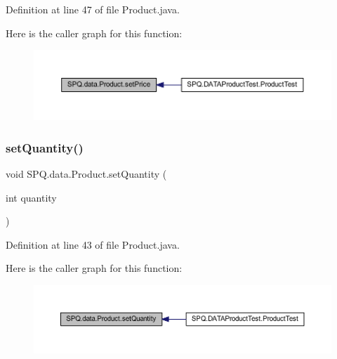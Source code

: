 Definition at line 47 of file Product.\+java.

Here is the caller graph for this function\+:
\nopagebreak
\begin{figure}[H]
\begin{center}
\leavevmode
\includegraphics[width=350pt]{class_s_p_q_1_1data_1_1_product_a6a12ed828fa7745b6bc8f5f2bc5dd014_icgraph}
\end{center}
\end{figure}
\mbox{\label{class_s_p_q_1_1data_1_1_product_a057c7298cb6575a0d709f3fe2bf73ea7}} 
\subsubsection{\texorpdfstring{set\+Quantity()}{setQuantity()}}
{\footnotesize\ttfamily void S\+P\+Q.\+data.\+Product.\+set\+Quantity (\begin{DoxyParamCaption}\item[{int}]{quantity }\end{DoxyParamCaption})}



Definition at line 43 of file Product.\+java.

Here is the caller graph for this function\+:
\nopagebreak
\begin{figure}[H]
\begin{center}
\leavevmode
\includegraphics[width=350pt]{class_s_p_q_1_1data_1_1_product_a057c7298cb6575a0d709f3fe2bf73ea7_icgraph}
\end{center}
\end{figure}
\mbox{\label{class_s_p_q_1_1data_1_1_product_ab7714f5e5a6f1b0a293ad7140c351c3c}} 
